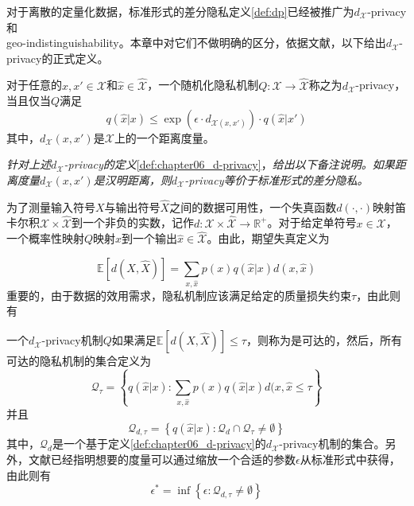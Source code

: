 对于离散的定量化数据，标准形式的差分隐私定义\ref{def:dp}已经被推广为$d_{\mathcal{X}}$-privacy\cite{chatzikokolakis2013broadening}和\\geo-indistinguishability\cite{andres2013geo,bordenabe2014optimal}。本章中对它们不做明确的区分，依据文献，以下给出$d_{\mathcal{X}}$-privacy的正式定义。

\begin{definition}\label{def:chapter06_d-privacy}
	对于任意的$x,x' \in \mathcal{X}$和$\hat{x} \in \hat{\mathcal{X}}$，一个随机化隐私机制$Q:\mathcal{X}\rightarrow \hat{\mathcal{X}}$称之为$d_{\mathcal{X}}$-privacy，当且仅当$Q$满足
	\begin{equation}
	q(\hat{x}|x) \leq \exp(\epsilon \cdot d_{\mathcal{X}(x,x')}) \cdot q(\hat{x}|x')
	\end{equation}
其中，$d_{\mathcal{X}}(x,x')$是$\mathcal{X}$上的一个距离度量。
\end{definition}

\begin{remark}{\em
针对上述$d_{\mathcal{X}}$-privacy的定义}\ref{def:chapter06_d-privacy}，{\em 给出以下备注说明。如果距离度量$d_{\mathcal{X}}(x,x')$是汉明距离，则$d_{\mathcal{X}}$-privacy等价于标准形式的差分隐私。}
\end{remark}

为了测量输入符号$X$与输出符号$\hat{X}$之间的数据可用性，一个失真函数$d(\cdot,\cdot)$映射笛卡尔积$\mathcal{X}\times \hat{\mathcal{X}}$到一个非负的实数，记作$d:\mathcal{X}\times \hat{\mathcal{X}} \rightarrow \mathbb{R}^{+}$。对于给定单符号$x \in \mathcal{X}$，一个概率性映射$Q$映射$x$到一个输出$\hat{x} \in \hat{\mathcal{X}}$。由此，期望失真定义为

\begin{equation}
\mathbb{E}[d(X,\hat{X})] = \sum_{x,\hat{x}}p(x) q(\hat{x}|x)d(x,\hat{x})
\end{equation}
重要的，由于数据的效用需求，隐私机制应该满足给定的质量损失约束$\tau$，由此则有

\begin{definition}
	一个$d_{\mathcal{X}}$-privacy机制$Q$如果满足$\mathbb{E}[d(X,\hat{X})] \leq \tau$，则称为是可达的，然后，所有可达的隐私机制的集合定义为
	\begin{equation}
		\mathcal{Q}_{\tau} = \left\{q(\hat{x}|x):\sum_{x,\hat{x}}p(x) q(\hat{x}|x)d(x,\hat{x} \leq \tau \right\}
	\end{equation}
并且
\begin{equation}
	\mathcal{Q}_{d,\tau}=\left \{q(\hat{x}|x):\mathcal{Q}_{d} \cap \mathcal{Q}_{\tau} \neq \emptyset \right\}
\end{equation}
其中，$\mathcal{Q}_d$是一个基于定义\textup{\ref{def:chapter06_d-privacy}}的$d_{\mathcal{X}}$-privacy机制的集合。另外，文献\textup{}已经指明想要的度量可以通过缩放一个合适的参数$\epsilon$从标准形式中获得，由此则有
\begin{equation}
\epsilon^* = \inf\left\{\epsilon: \mathcal{Q}_{d,\tau} \neq \emptyset \right\}
\end{equation}
\end{definition}

